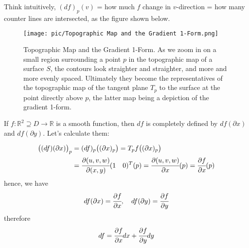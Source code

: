 \documentclass[10pt]{article}
\begin{document}
        Think intuitively, $(df)_p(v)$ = how much $f$ change in $v$-direction = how many counter lines are intersected, as the figure shown below.

        \begin{figure}[H]
            \centering
            \texttt{[image: pic/Topographic Map and the Gradient 1-Form.png]}
            \caption{Topographic Map and the Gradient 1-Form. As we zoom in on a small region surrounding a point $p$ in the topographic map of a surface $S$, the contours look straighter and straighter, and more and more evenly spaced. Ultimately they become the representatives of the topographic map of the tangent plane $T_p$ to the surface at the point directly above $p$, the latter map being a depiction of the gradient 1-form.}
        \end{figure}

        \begin{proposition}[$df$]
            If $f: \mathbb{R}^2\supseteq D\rightarrow\mathbb{R}$ is a smooth function, then $df$ is completely defined by $df(\partial x)$ and $df(\partial y)$. Let's calculate them:
            
            \begin{equation*}
                \begin{aligned}
                    \big((df)(\partial x)\big)_p &= (df)_p\big((\partial x)_p\big) = T_pf\big((\partial x)_p\big) \\
                    &= \cfrac{\partial(u,v,w)}{\partial(x,y)}(1\quad 0)^T(p) = \cfrac{\partial(u,v,w)}{\partial x}(p) = \cfrac{\partial f}{\partial x}(p) 
                \end{aligned}
            \end{equation*}
            hence, we have
            \begin{equation*}
                \begin{aligned}
                    df(\partial x) = \cfrac{\partial f}{\partial x}, \quad df(\partial y) = \cfrac{\partial f}{\partial y}
                \end{aligned}
            \end{equation*}
            therefore
            \begin{equation*}
                \begin{aligned}
                    df = \cfrac{\partial f}{\partial x} dx + \cfrac{\partial f}{\partial y} dy
                \end{aligned}
            \end{equation*}
        \end{proposition}
        
\end{document}
